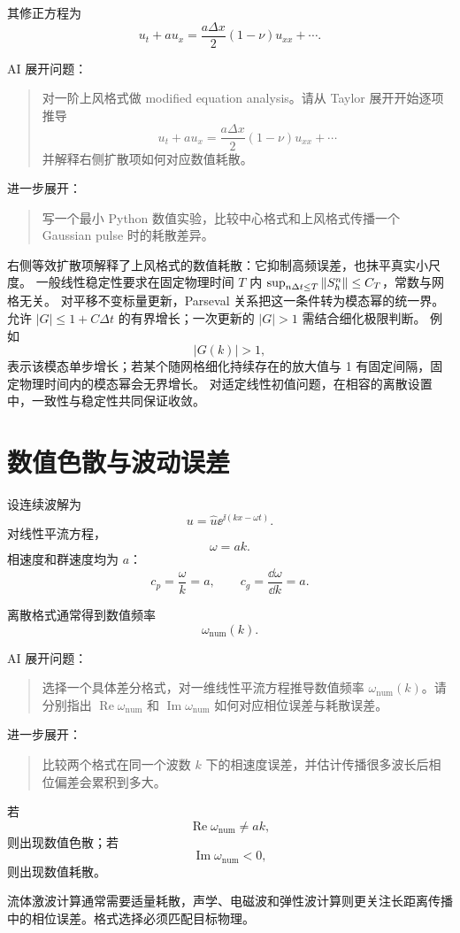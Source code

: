 其修正方程为
\[
u_t+au_x
=
\frac{a\Delta x}{2}(1-\nu)u_{xx}
+\cdots.
\]

\begin{askai}
AI 展开问题：
\begin{quote}
对一阶上风格式做 modified equation analysis。请从 Taylor 展开开始逐项推导
\[
u_t+au_x=\frac{a\Delta x}{2}(1-\nu)u_{xx}+\cdots
\]
并解释右侧扩散项如何对应数值耗散。
\end{quote}

进一步展开：
\begin{quote}
写一个最小 Python 数值实验，比较中心格式和上风格式传播一个 Gaussian pulse 时的耗散差异。
\end{quote}
\end{askai}

右侧等效扩散项解释了上风格式的数值耗散：它抑制高频误差，也抹平真实小尺度。
一般线性稳定性要求在固定物理时间 $T$ 内
$\sup_{n\Delta t\le T}\left\lVert S_h^n\right\rVert\le C_T$，常数与网格无关。
对平移不变标量更新，Parseval 关系把这一条件转为模态幂的统一界。
允许 $|G|\le1+C\Delta t$ 的有界增长；一次更新的 $|G|>1$ 需结合细化极限判断。
例如
\[
|G(k)|>1,
\]
表示该模态单步增长；若某个随网格细化持续存在的放大值与 1 有固定间隔，固定物理时间内的模态幂会无界增长。
对适定线性初值问题，在相容的离散设置中，一致性与稳定性共同保证收敛。

\section{数值色散与波动误差}
设连续波解为
\[
u=\widehat u\ee^{\ii(kx-\omega t)}.
\]
对线性平流方程，
\[
\omega=ak.
\]
相速度和群速度均为 \(a\)：
\[
c_p=\frac{\omega}{k}=a,
\qquad
c_g=\frac{\dd\omega}{\dd k}=a.
\]

离散格式通常得到数值频率
\[
\omega_{\mathrm{num}}(k).
\]

\begin{askai}
AI 展开问题：
\begin{quote}
选择一个具体差分格式，对一维线性平流方程推导数值频率 \(\omega_{\mathrm{num}}(k)\)。请分别指出 \(\operatorname{Re}\omega_{\mathrm{num}}\) 和 \(\operatorname{Im}\omega_{\mathrm{num}}\) 如何对应相位误差与耗散误差。
\end{quote}

进一步展开：
\begin{quote}
比较两个格式在同一个波数 \(k\) 下的相速度误差，并估计传播很多波长后相位偏差会累积到多大。
\end{quote}
\end{askai}

若
\[
\operatorname{Re}\omega_{\mathrm{num}}\neq ak,
\]
则出现数值色散；若
\[
\operatorname{Im}\omega_{\mathrm{num}}<0,
\]
则出现数值耗散。

流体激波计算通常需要适量耗散，声学、电磁波和弹性波计算则更关注长距离传播中的相位误差。格式选择必须匹配目标物理。
